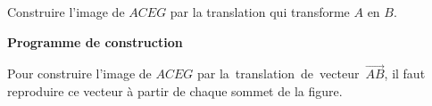 \begin{methode*1}    
    \exercice
    Construire l'image de $ACEG$ par la translation qui transforme $A$ en $B$.
    \correction
    \begin{minipage}{0.45\linewidth}
        \begin{center}
        \end{center}
    \end{minipage}
    \begin{minipage}{0.55\linewidth}
        \textbf{Programme de construction}

        Pour construire l'image de $ACEG$ par \mbox{la translation de vecteur $\overrightarrow{AB}$}, il faut reproduire ce vecteur à partir de chaque sommet de la figure.
    \end{minipage}
    \smallskip
    \creditInstrumentPoche
\end{methode*1}
